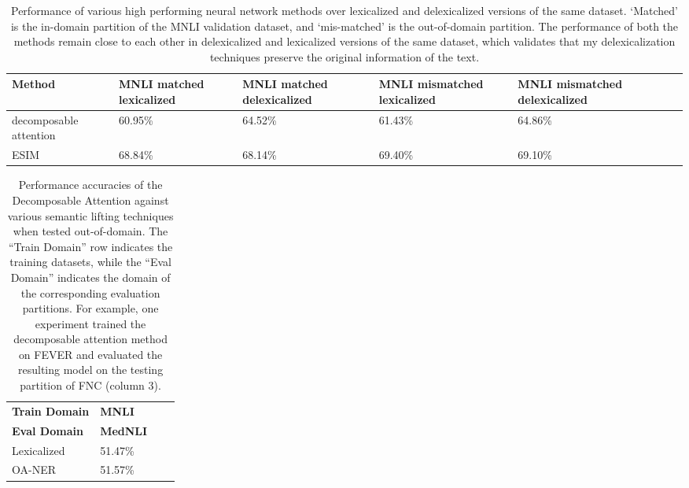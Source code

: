 \documentclass{article}
\begin{document}
\begin{table}[t]
\begin{center}
\begin{tabular}{|p{20mm}|p{20mm}|p{20mm}|p{20mm}|p{20mm}|p{20mm}|p{20mm}|}
\hline 
\textbf{Method} & \textbf{MNLI matched lexicalized }& \textbf{MNLI matched delexicalized } & \textbf{MNLI mismatched lexicalized } &\textbf{MNLI mismatched delexicalized } \\
 \hline
decomposable attention & {60.95\%} &{64.52\%} &{61.43\%}&{64.86\%}\\
\hline 
ESIM  & {68.84\%} &{68.14\%} &{69.40\%}&{69.10\%}\\
\hline 
\end{tabular}
\end{center}
\caption{Performance of various high performing neural network methods over lexicalized and delexicalized versions of the same dataset. `Matched' is the in-domain partition of the MNLI validation dataset, and `mis-matched' is the out-of-domain partition. The performance of both the methods remain close to each other in delexicalized and lexicalized versions of the same dataset, which validates that my  delexicalization techniques preserve the original information of the text. }

    \label{results}
\end{table}



\begin{table}[h]
\begin{center}
\begin{tabular}{|p{25mm}|p{12mm}|p{11mm}|p{10mm}|}
 \hline
\textbf{Train Domain} & \textbf{MNLI} \\ 
 \textbf{Eval Domain} & \textbf{MedNLI} \\ 
\hline
Lexicalized &51.47\% \\
OA-NER &51.57\%\\
\hline
\end{tabular}
\end{center}
    \caption{ Performance accuracies of the Decomposable Attention against various semantic lifting techniques when tested out-of-domain. The ``Train Domain'' row indicates the training datasets, while the ``Eval Domain'' indicates the domain of the corresponding evaluation partitions. For example, one experiment trained the decomposable attention method on FEVER and evaluated the resulting model on the testing partition of FNC (column 3). }
    
    \label{results_outofdomain}
\end{table}
\end{document}
